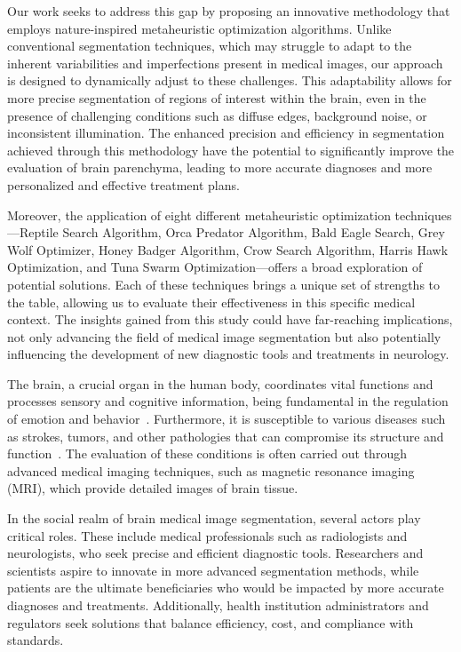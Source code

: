 \documentclass{elsarticle}
\begin{document}
Our work seeks to address this gap by proposing an innovative methodology that employs nature-inspired metaheuristic optimization algorithms. Unlike conventional segmentation techniques, which may struggle to adapt to the inherent variabilities and imperfections present in medical images, our approach is designed to dynamically adjust to these challenges. This adaptability allows for more precise segmentation of regions of interest within the brain, even in the presence of challenging conditions such as diffuse edges, background noise, or inconsistent illumination. The enhanced precision and efficiency in segmentation achieved through this methodology have the potential to significantly improve the evaluation of brain parenchyma, leading to more accurate diagnoses and more personalized and effective treatment plans.

Moreover, the application of eight different metaheuristic optimization techniques—Reptile Search Algorithm, Orca Predator Algorithm, Bald Eagle Search, Grey Wolf Optimizer, Honey Badger Algorithm, Crow Search Algorithm, Harris Hawk Optimization, and Tuna Swarm Optimization—offers a broad exploration of potential solutions. Each of these techniques brings a unique set of strengths to the table, allowing us to evaluate their effectiveness in this specific medical context. The insights gained from this study could have far-reaching implications, not only advancing the field of medical image segmentation but also potentially influencing the development of new diagnostic tools and treatments in neurology.




\noindent The brain, a crucial organ in the human body, coordinates vital functions and processes sensory and cognitive information, being fundamental in the regulation of emotion and behavior~\cite{Raichle2010}. Furthermore, it is susceptible to various diseases such as strokes, tumors, and other pathologies that can compromise its structure and function~\cite{Fornito2015,Kreisl2008}. The evaluation of these conditions is often carried out through advanced medical imaging techniques, such as magnetic resonance imaging (MRI), which provide detailed images of brain tissue\cite{Young2007,Mehrabian2019}.

\noindent In the social realm of brain medical image segmentation, several actors play critical roles. These include medical professionals such as radiologists and neurologists, who seek precise and efficient diagnostic tools. Researchers and scientists aspire to innovate in more advanced segmentation methods, while patients are the ultimate beneficiaries who would be impacted by more accurate diagnoses and treatments. Additionally, health institution administrators and regulators seek solutions that balance efficiency, cost, and compliance with standards.
\end{document}
